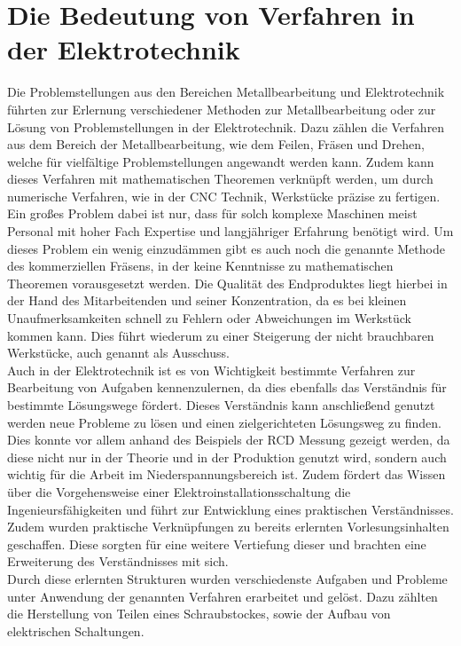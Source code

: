 \section{Die Bedeutung von Verfahren in der Elektrotechnik}

Die Problemstellungen aus den Bereichen Metallbearbeitung und Elektrotechnik führten zur Erlernung verschiedener Methoden zur Metallbearbeitung oder zur 
Lösung von Problemstellungen in der Elektrotechnik. Dazu zählen die Verfahren aus dem Bereich der Metallbearbeitung, wie \zB dem Feilen, Fräsen und Drehen, 
welche für vielfältige Problemstellungen angewandt werden kann. Zudem kann dieses Verfahren mit mathematischen Theoremen verknüpft werden, um \zB durch 
numerische Verfahren, wie in der CNC Technik, Werkstücke präzise zu fertigen. Ein großes Problem dabei ist nur, dass für solch komplexe Maschinen meist 
Personal mit hoher Fach Expertise und langjähriger Erfahrung benötigt wird. Um dieses Problem ein wenig einzudämmen gibt es auch noch die genannte Methode 
des kommerziellen Fräsens, in der keine Kenntnisse zu mathematischen Theoremen vorausgesetzt werden. Die Qualität des Endproduktes liegt hierbei in der 
Hand des Mitarbeitenden und seiner Konzentration, da es bei kleinen Unaufmerksamkeiten schnell zu Fehlern oder Abweichungen im Werkstück kommen kann. Dies 
führt wiederum zu einer Steigerung der nicht brauchbaren Werkstücke, auch genannt als Ausschuss.
\\
Auch in der Elektrotechnik ist es von Wichtigkeit bestimmte Verfahren zur Bearbeitung von Aufgaben kennenzulernen, da dies ebenfalls das Verständnis für 
bestimmte Lösungswege fördert. Dieses Verständnis kann anschließend genutzt werden neue Probleme zu lösen und einen zielgerichteten Lösungsweg zu finden. 
Dies konnte vor allem anhand des Beispiels der RCD Messung gezeigt werden, da diese nicht nur in der Theorie und in der Produktion genutzt wird, sondern 
auch wichtig für die Arbeit im Niederspannungsbereich ist. Zudem fördert das Wissen über die Vorgehensweise einer Elektroinstallationsschaltung die 
Ingenieursfähigkeiten und führt zur Entwicklung eines praktischen Verständnisses. Zudem wurden praktische Verknüpfungen zu bereits erlernten 
Vorlesungsinhalten geschaffen. Diese sorgten für eine weitere Vertiefung dieser und brachten eine Erweiterung des Verständnisses mit sich.
\\
Durch diese erlernten Strukturen wurden verschiedenste Aufgaben und Probleme unter Anwendung der genannten Verfahren erarbeitet und gelöst. Dazu 
zählten \zB die Herstellung von Teilen eines Schraubstockes, sowie der Aufbau von elektrischen Schaltungen.


\clearpage